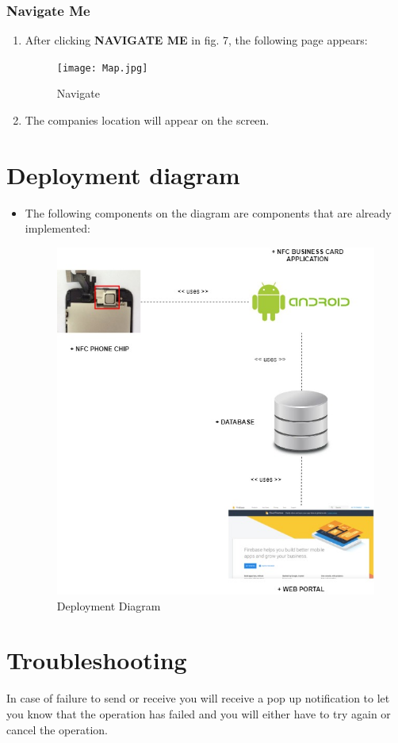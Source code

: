\documentclass[english]{article}
\begin{document}
	\subsubsection{Navigate Me}
		\begin{enumerate}
			\item After clicking \textbf{NAVIGATE ME} in fig. 7, the following page appears:
			\begin{figure}[H]
				\centering
				\texttt{[image: Map.jpg]}
				\caption{Navigate}
				\label{figure: 9}
			\end{figure} 
			\item The companies location will appear on the screen.
		\end{enumerate}
	\section {Deployment diagram}
		\begin{itemize}
			\item The following components on the diagram are components that are already implemented:
			\begin{figure}[H]
				\centering
				\includegraphics[scale=0.3]{Deployment.jpg}
				\caption{Deployment Diagram}
				\label{figure: 10}
			\end{figure}
		\end{itemize}
	\section {Troubleshooting}
		In case of failure to send or receive you will receive a pop up notification to let you know that the operation has failed and you will either have to try again or cancel the operation.
	
\end{document}
